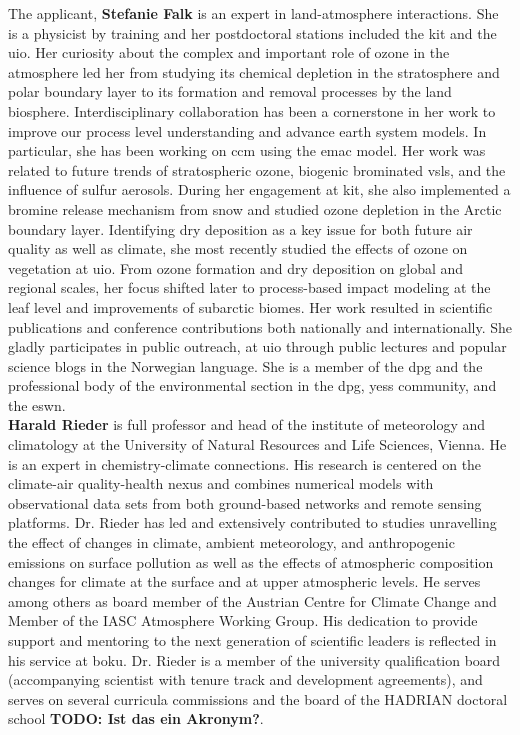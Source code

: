 The applicant, \textbf{Stefanie Falk} is an expert in land-atmosphere interactions. She is a physicist by training and her postdoctoral stations included the \gls{kit} and the \gls{uio}. Her curiosity about the complex and important role of ozone in the atmosphere led her from studying its chemical depletion in the stratosphere and polar boundary layer to its formation and removal processes by the land biosphere. Interdisciplinary collaboration has been a cornerstone in her work to improve our process level understanding and advance earth system models. In particular, she has been working on \gls{ccm} using the \gls{emac} model. Her work was related to future trends of stratospheric ozone, biogenic brominated \gls{vsls}, and the influence of sulfur aerosols. During her engagement at \gls{kit}, she also implemented a bromine release mechanism from snow and studied ozone depletion in the Arctic boundary layer. Identifying dry deposition as a key issue for both future air quality as well as climate, she most recently studied the effects of ozone on vegetation  at \gls{uio}. From ozone formation and dry deposition on global and regional scales, her focus shifted later to process-based impact modeling at the leaf level and improvements of subarctic biomes. Her work resulted in scientific publications and conference contributions both nationally and internationally. She gladly participates in public outreach, at \gls{uio} through public lectures and popular science blogs in the Norwegian language. She is a member of the \gls{dpg} and the professional body of the environmental section in the \gls{dpg}, \gls{yess} community, and the \gls{eswn}.\\

\textbf{Harald Rieder} is full professor and head of the institute of meteorology and climatology at the University of Natural Resources and Life Sciences, Vienna. He is an expert in chemistry-climate connections. His research is centered on the climate-air quality-health nexus and combines numerical models with observational data sets from both ground-based networks and remote sensing platforms. Dr. Rieder has led and extensively contributed to studies unravelling the effect of changes in climate, ambient meteorology, and anthropogenic emissions on surface pollution as well as the effects of atmospheric composition changes for climate at the surface and at upper atmospheric levels. He serves among others as board member of the Austrian Centre for Climate Change and Member of the IASC Atmosphere Working Group. His dedication to provide support and mentoring to the next generation of scientific leaders is reflected in his service at \gls{boku}. Dr. Rieder is a member of the university qualification board (accompanying scientist with tenure track and development agreements), and serves on several curricula commissions and the board of the HADRIAN doctoral school \textbf{TODO: Ist das ein Akronym?}. 
